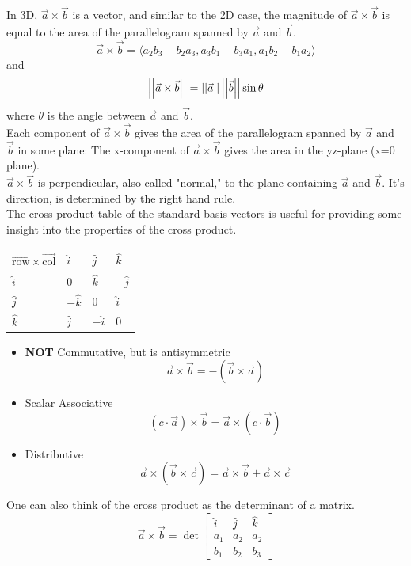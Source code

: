 \noindent
In 3D, $\vec{a}\times\vec{b}$ is a vector, and similar to the 2D case, the magnitude of $\vec{a}\times\vec{b}$ is equal to the area of the parallelogram spanned by $\vec{a}$ and $\vec{b}$.
\begin{equation*}
	\vec{a}\times\vec{b} = \langle a_2b_3-b_2a_3,a_3b_1-b_3a_1,a_1b_2-b_1a_2 \rangle
\end{equation*}
and
\begin{equation*}
	\left|\left|\vec{a}\times\vec{b}\right|\right|=\left|\left|\vec{a}\right|\right|\left|\left|\vec{b}\right|\right|\sin{\theta}
\end{equation*}
where $\theta$ is the angle between $\vec{a}$ and $\vec{b}$.\\
Each component of $\vec{a}\times\vec{b}$ gives the area of the parallelogram spanned by $\vec{a}$ and $\vec{b}$ in some plane: The x-component of $\vec{a}\times\vec{b}$ gives the area in the yz-plane (x=0 plane).\\
$\vec{a}\times\vec{b}$ is perpendicular, also called "normal," to the plane containing $\vec{a}$ and $\vec{b}$. It's direction, is determined by the right hand rule.\\

\noindent
The cross product table of the standard basis vectors is useful for providing some insight into the properties of the cross product.
\begin{table}[h]
	\centering
	\renewcommand{\arraystretch}{1.5}
	\begin{tabular}{|l|l|l|l|}
		\hline
		$\overrightarrow{\text{row}}\times\overrightarrow{\text{col}}$ & $\hat{i}$  & $\hat{j}$  & $\hat{k}$  \\ \hline
		$\hat{i}$                                & $0$        & $\hat{k}$  & $-\hat{j}$ \\ \hline
		$\hat{j}$                                & $-\hat{k}$ & $0$        & $\hat{i}$  \\ \hline
		$\hat{k}$                                & $\hat{j}$  & $-\hat{i}$ & $0$        \\ \hline
	\end{tabular}
\end{table}

\begin{itemize}
	\item \textbf{NOT} Commutative, but is antisymmetric
	\begin{equation*}
		\vec{a}\times\vec{b} = -\left(\vec{b}\times\vec{a}\right)
	\end{equation*}
	\item Scalar Associative
	\begin{equation*}
		\left(c\cdot\vec{a}\right)\times\vec{b}=\vec{a}\times\left(c\cdot\vec{b}\right)
	\end{equation*}
	\item Distributive
	\begin{equation*}
		\vec{a}\times\left(\vec{b}\times\vec{c}\right) = \vec{a}\times\vec{b} + \vec{a}\times\vec{c}
	\end{equation*}
\end{itemize}

\noindent
One can also think of the cross product as the determinant of a matrix.
\begin{equation*}
	\vec{a}\times\vec{b} = \det\begin{bmatrix}
		\hat{i}& \hat{j} & \hat{k} \\
		a_1 & a_2 & a_2\\
		b_1 & b_2 & b_3 
	\end{bmatrix}
\end{equation*}
